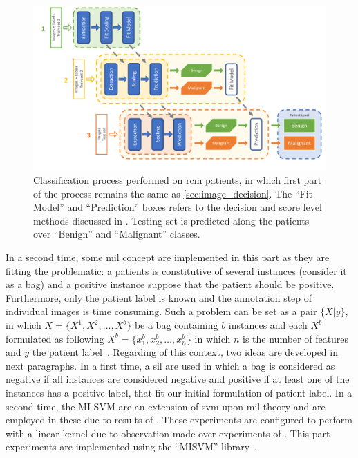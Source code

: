 \documentclass[journal,article,submit,moreauthors,pdftex, applsci]{Definitions/mdpi}
\begin{document}
\begin{figure}[h]
    \begin{center}
        \includegraphics[width=\linewidth]{Figures/Process_Decision.pdf}
        \caption{Classification process performed on \ac{rcm} patients, in which first part of the process remains the same as \cref{sec:image_decision}. The “Fit Model” and “Prediction” boxes refers to the decision and score level methods discussed in . Testing set is predicted along the patients over “Benign” and “Malignant” classes.}
        \label{fig:decision_process}
    \end{center} 
\end{figure}\par
In a second time, some \ac{mil} concept are implemented in this part as they are fitting the problematic: a patients is constitutive of several instances (consider it as a bag) and a positive instance suppose that the patient should be positive. Furthermore, only the patient label is known and the annotation step of individual images is time consuming. Such a problem can be set as a pair \(\{X|y\}\), in which \(X=\{X^1,X^2,\ldots,X^b\}\) be a bag containing \(b\) instances and each \(X^b\) formulated as following \(X^b=\{x^b_1,x^b_2,\ldots,x^b_n\}\) in which \(n\) is the number of features and \(y\) the patient label~\cite{foulds_frank_2010}. Regarding of this context, two ideas are developed in next paragraphs. In a first time, a \ac{sil} are used in which a bag is considered as negative if all instances are considered negative and positive if at least one of the instances has a positive label, that fit our initial formulation of patient label. In a second time, the MI-SVM are an extension of \ac{svm} upon \ac{mil} theory and are employed in these due to results of . These experiments are configured to perform with a linear kernel due to observation made over experiments of . This part experiments are implemented using the “MISVM” library~\cite{Doran2014}.\par
\end{document}
